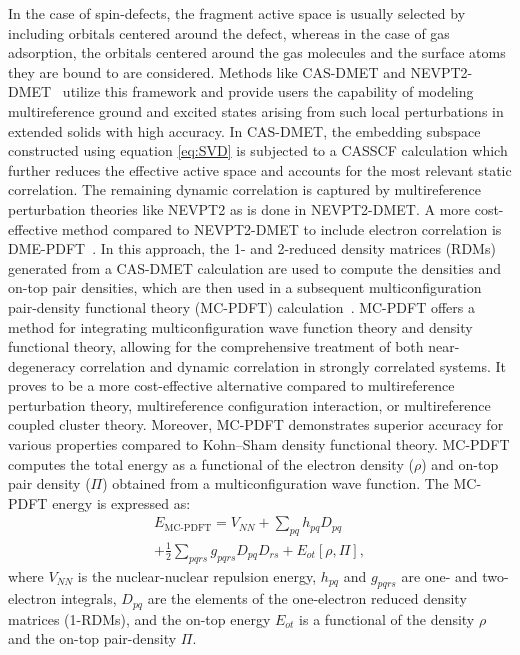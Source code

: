 In the case of spin-defects, the fragment active space is usually selected by including orbitals centered around the defect, whereas in the case of gas adsorption, the orbitals centered around the gas molecules and the surface atoms they are bound to are considered.
Methods like CAS-DMET and NEVPT2-DMET~\cite{mitra2021excited, haldar2023local, Verma2023}  utilize this framework and provide users the capability of modeling multireference ground and excited states arising from such local perturbations in extended solids with high accuracy.
In CAS-DMET, the embedding subspace constructed using equation \ref{eq:SVD} is subjected to a CASSCF calculation which further reduces the effective active space and accounts for the most relevant static correlation.
The remaining dynamic correlation is captured by multireference perturbation theories like NEVPT2\cite{NEVPT2-0,NEVPT2-1,NEVPT2-2} as is done in NEVPT2-DMET.
A more cost-effective method compared to NEVPT2-DMET to include electron correlation is DME-PDFT~\cite{Mitra2023}.
In this approach, the 1- and 2-reduced density matrices (RDMs) generated from a CAS-DMET calculation are used to compute the densities and on-top pair densities, which are then used in a subsequent 
multiconfiguration pair-density functional theory (MC-PDFT) calculation~\cite{LiManni2014, mcpdft,Zhou2022}.
MC-PDFT offers a method for integrating multiconfiguration wave function theory and density functional theory, allowing for the comprehensive treatment of both near-degeneracy correlation and dynamic correlation in strongly correlated systems. It proves to be a more cost-effective alternative compared to multireference perturbation theory, multireference configuration interaction, or multireference coupled cluster theory. Moreover, MC-PDFT demonstrates superior accuracy for various properties compared to Kohn–Sham density functional theory.
MC-PDFT computes the total energy as a functional of the electron density ($\rho$) and on-top pair density ($\Pi$) obtained from a multiconfiguration wave function.
The MC-PDFT energy is expressed as:
\begin{multline}
    E_{\text{MC-PDFT}}  = V_{NN} + \sum_{pq} h_{pq} D_{pq}\\
     + \frac{1}{2} \sum_{pqrs} g_{pqrs} D_{pq} D_{rs} + E_{ot} [\rho,\Pi],
\end{multline}
where \( V_{NN} \) is the nuclear-nuclear repulsion energy, \( h_{pq} \) and \( g_{pqrs} \) are one- and two-electron integrals, \( D_{pq} \) are the elements of the one-electron reduced density matrices (1-RDMs), and the on-top energy \( E_{ot} \) is a functional of the density \( \rho \) and the on-top pair-density \( \Pi \).

